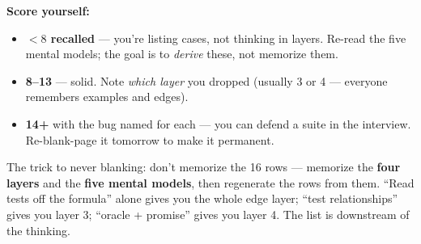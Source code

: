 \textbf{Score yourself:}
\begin{itemize}[leftmargin=1.5em,nosep]
  \item \textbf{$<8$ recalled} --- you're listing cases, not thinking in layers.
        Re-read the five mental models; the goal is to \emph{derive} these, not
        memorize them.
  \item \textbf{8--13} --- solid. Note \emph{which layer} you dropped (usually 3
        or 4 --- everyone remembers examples and edges).
  \item \textbf{14+} with the bug named for each --- you can defend a suite in the
        interview. Re-blank-page it tomorrow to make it permanent.
\end{itemize}

\begin{intu}
The trick to never blanking: don't memorize the 16 rows --- memorize the
\textbf{four layers} and the \textbf{five mental models}, then regenerate the rows
from them. ``Read tests off the formula'' alone gives you the whole edge layer;
``test relationships'' gives you layer 3; ``oracle + promise'' gives you layer 4.
The list is downstream of the thinking.
\end{intu}
